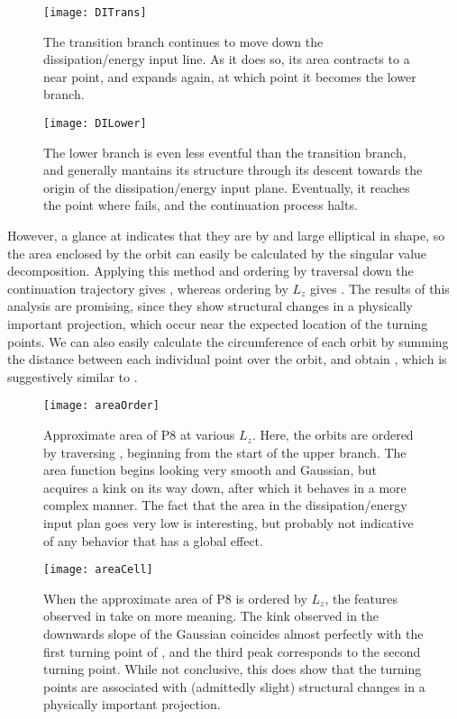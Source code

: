 \begin{figure}[h]
\texttt{[image: DITrans]}
\caption{The transition branch continues to move down the dissipation/energy input line. As it does so, its area contracts to a near point, and expands again, at which point it becomes the lower branch. }\label{fig:DITrans}
\end{figure}

\begin{figure}[h]
\texttt{[image: DILower]}
\caption{The lower branch is even less eventful than the transition branch, and generally mantains its structure through its descent towards the origin of the dissipation/energy input plane. Eventually, it reaches the point where  fails, and the continuation process halts.}\label{fig:DILower}
\end{figure}

However, a glance at  indicates that they are by and large elliptical in shape, so the area enclosed by the orbit can easily be calculated by the singular value decomposition. Applying this method and ordering by traversal down the continuation trajectory gives , whereas ordering by $L_z$ gives . The results of this analysis are promising, since they show structural changes in a physically important projection, which occur near the expected location of the turning points. We can also easily calculate the circumference of each orbit by summing the distance between each individual point over the orbit, and obtain , which is suggestively similar to . \\

\begin{figure}[h!]
\texttt{[image: areaOrder]}
\caption{Approximate area of P8 at various $L_z$. Here, the orbits are ordered by traversing , beginning from the start of the upper branch. The area function begins looking very smooth and Gaussian, but acquires a kink on its way down, after which it behaves in a more complex manner. The fact that the area in the dissipation/energy input plan goes very low is interesting, but probably not indicative of any behavior that has a global effect.}\label{fig:areaOrder}
\end{figure}

\begin{figure}[h!]
\texttt{[image: areaCell]}
\caption{When the approximate area of P8 is ordered by $L_z$, the features observed in  take on more meaning. The kink observed in the downwards slope of the Gaussian coincides almost perfectly with the first turning point of , and the third peak corresponds to the second turning point. While not conclusive, this does show that the turning points are associated with (admittedly slight) structural changes in a physically important projection. }\label{fig:areaCell}
\end{figure}

